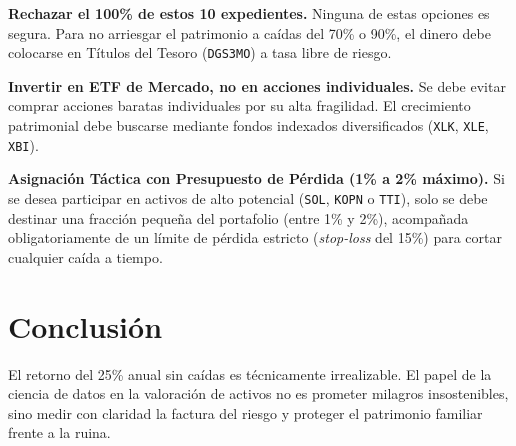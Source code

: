 \documentclass[11pt,a4paper]{article}
\begin{document}
\begin{description}[leftmargin=3.2cm]
    \item[\textbf{1. Conservación:}] \textbf{Rechazar el 100\% de estos 10 expedientes.} Ninguna de estas opciones es segura. Para no arriesgar el patrimonio a caídas del 70\% o 90\%, el dinero debe colocarse en Títulos del Tesoro (\texttt{DGS3MO}) a tasa libre de riesgo.
    \item[\textbf{2. Crecimiento:}] \textbf{Invertir en ETF de Mercado, no en acciones individuales.} Se debe evitar comprar acciones baratas individuales por su alta fragilidad. El crecimiento patrimonial debe buscarse mediante fondos indexados diversificados (\texttt{XLK}, \texttt{XLE}, \texttt{XBI}).
    \item[\textbf{3. Especulación:}] \textbf{Asignación Táctica con Presupuesto de Pérdida (1\% a 2\% máximo).} Si se desea participar en activos de alto potencial (\texttt{SOL}, \texttt{KOPN} o \texttt{TTI}), solo se debe destinar una fracción pequeña del portafolio (entre 1\% y 2\%), acompañada obligatoriamente de un límite de pérdida estricto (\textit{stop-loss} del 15\%) para cortar cualquier caída a tiempo.
\end{description}

\section{Conclusión}
El retorno del 25\% anual sin caídas es técnicamente irrealizable. El papel de la ciencia de datos en la valoración de activos no es prometer milagros insostenibles, sino medir con claridad la factura del riesgo y proteger el patrimonio familiar frente a la ruina.
\end{document}

